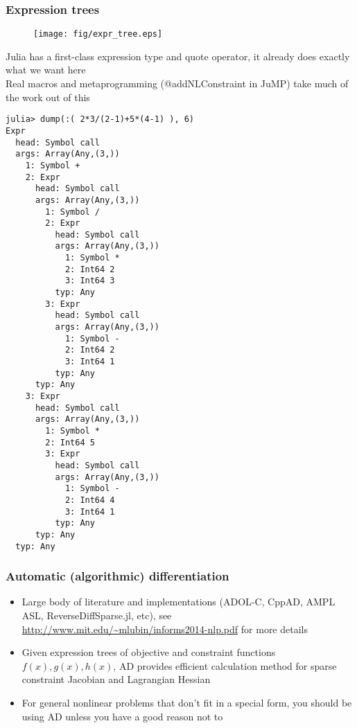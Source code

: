 \documentclass[compressed,dvips,letter]{beamer}
\begin{document}
\begin{frame}[fragile]\frametitle{Expression trees}
\vspace{-15pt}
\begin{minipage}{0.55\textwidth}
\begin{figure}
\texttt{[image: fig/expr\_tree.eps]}
\end{figure}

Julia has a first-class expression type and quote operator,
it already does exactly what we want here \\

Real macros and metaprogramming ({\selectfont @addNLConstraint} in JuMP) take much of the work out of this

\end{minipage}
\begin{minipage}{0.35\textwidth}
{\fontsize{6.8pt}{0} \selectfont
\begin{verbatim}
julia> dump(:( 2*3/(2-1)+5*(4-1) ), 6)
Expr
  head: Symbol call
  args: Array(Any,(3,))
    1: Symbol +
    2: Expr
      head: Symbol call
      args: Array(Any,(3,))
        1: Symbol /
        2: Expr
          head: Symbol call
          args: Array(Any,(3,))
            1: Symbol *
            2: Int64 2
            3: Int64 3
          typ: Any
        3: Expr
          head: Symbol call
          args: Array(Any,(3,))
            1: Symbol -
            2: Int64 2
            3: Int64 1
          typ: Any
      typ: Any
    3: Expr
      head: Symbol call
      args: Array(Any,(3,))
        1: Symbol *
        2: Int64 5
        3: Expr
          head: Symbol call
          args: Array(Any,(3,))
            1: Symbol -
            2: Int64 4
            3: Int64 1
          typ: Any
      typ: Any
  typ: Any
\end{verbatim}
}
\end{minipage}
\end{frame}
%
%


\begin{frame}[fragile]\frametitle{Automatic (algorithmic) differentiation}

\begin{itemize}
\item Large body of literature and implementations (ADOL-C, CppAD, AMPL ASL, ReverseDiffSparse.jl, etc), see \url{http://www.mit.edu/~mlubin/informs2014-nlp.pdf} for more details
\item Given expression trees of objective and constraint functions $f(x), g(x), h(x)$, AD provides efficient calculation method for sparse constraint Jacobian and Lagrangian Hessian
\item For general nonlinear problems that don't fit in a special form, you should be using AD unless you have a good reason not to
\end{itemize}

\end{frame}
%
%
\end{document}
